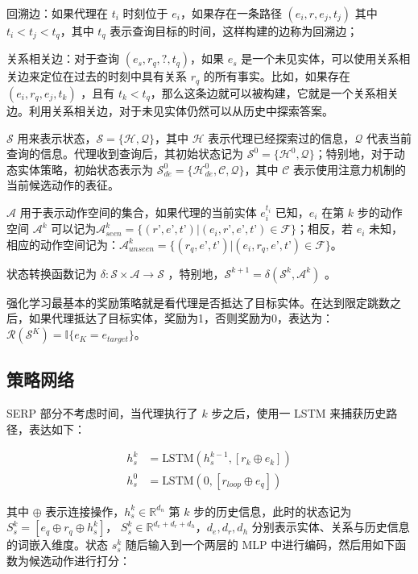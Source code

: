 \documentclass[a4paper, AutoFakeBold]{article}
\begin{document}
回溯边：如果代理在 $t_i$ 时刻位于 $e_i$，如果存在一条路径 $(e_i,r,e_j,t_j)$ 其中 $t_i< t_j<t_q$，其中 $t_q$ 表示查询目标的时间，这样构建的边称为回溯边；

关系相关边：对于查询 $(e_s,r_q,?,t_q)$，如果 $e_s$ 是一个未见实体，可以使用关系相关边来定位在过去的时刻中具有关系 $r_q$ 的所有事实。比如，如果存在 $(e_i,r_q,e_j,t_k)$ ，且有 $t_k<t_q$，那么这条边就可以被构建，它就是一个关系相关边。利用关系相关边，对于未见实体仍然可以从历史中探索答案。

${\mathcal S}$ 用来表示状态，${\mathcal S}=\{{\mathcal H},{\mathcal Q}\}$，其中 ${\mathcal H}$ 表示代理已经探索过的信息，${\mathcal Q}$ 代表当前查询的信息。代理收到查询后，其初始状态记为 ${\mathcal S}^0=\{{\mathcal H}^0,{\mathcal Q}\}$；特别地，对于动态实体策略，初始状态表示为 ${\mathcal S}^0_{de}=\{{\mathcal H}^0_{de},{\mathcal C},{\mathcal Q}\}$，其中 ${\mathcal C}$ 表示使用注意力机制的当前候选动作的表征。

${\mathcal A}$ 用于表示动作空间的集合，如果代理的当前实体 $e_i^{t_i}$ 已知，$e_i$ 在第 $k$ 步的动作空间 ${\mathcal A}^k$ 可以记为${\mathcal A}^k_{seen}=\{(r’,e’,t’)|(e_i,r’,e’,t’)\in{\mathcal F}\}$；相反，若 $e_i$ 未知，相应的动作空间记为：${\mathcal A}^k_{unseen}=\{(r_q,e’,t’)|(e_i,r_q,e’,t’)\in{\mathcal F}\}$。

状态转换函数记为 $\delta:{\mathcal S}\times{\mathcal A}\rightarrow{\mathcal S}$ ，特别地，${\mathcal S}^{k+1}=\delta({\mathcal S}^k,{\mathcal A}^k)$ 。

强化学习最基本的奖励策略就是看代理是否抵达了目标实体。在达到限定跳数之后，如果代理抵达了目标实体，奖励为1，否则奖励为0，表达为：${\mathcal R}({\mathcal S}^K)={{\mathbb I}\{e_K=e_{target}\}}$。


\subsection{策略网络}

SERP 部分不考虑时间，当代理执行了 $k$ 步之后，使用一 LSTM 来捕获历史路径，表达如下：

\begin{equation}
	\begin{aligned}
h^k_s & =\text{LSTM}(h_s^{k-1},[r_k\oplus e_k]) \\ 
h^0_s & =\text{LSTM}(0,[r_{loop}\oplus e_q])
	\end{aligned}
\end{equation}

其中 $\oplus$ 表示连接操作，$h_s^k\in{\mathbb R}^{d_n}$ 第 $k$ 步的历史信息，此时的状态记为$S_s^k=[e_q\oplus r_q \oplus h^k_s]$， $S_s^k\in{\mathbb R}^{d_e+d_r+d_h}$，$d_e,d_r,d_h$ 分别表示实体、关系与历史信息的词嵌入维度。状态 $s_s^k$ 随后输入到一个两层的 MLP 中进行编码，然后用如下函数为候选动作进行打分：
\end{document}
